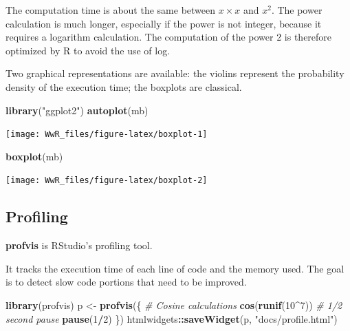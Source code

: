 \documentclass[
  12pt,
  american,
  a4paper,
  extrafontsizes,onecolumn,openright
  ]{memoir}
\newenvironment{Shaded}{\begin{snugshade}}{\end{snugshade}}
\newcommand{\CommentTok}[1]{\textcolor[rgb]{0.56,0.35,0.01}{\textit{#1}}}
\newcommand{\DecValTok}[1]{\textcolor[rgb]{0.00,0.00,0.81}{#1}}
\newcommand{\FunctionTok}[1]{\textcolor[rgb]{0.13,0.29,0.53}{\textbf{#1}}}
\newcommand{\NormalTok}[1]{#1}
\newcommand{\OtherTok}[1]{\textcolor[rgb]{0.56,0.35,0.01}{#1}}
\newcommand{\SpecialCharTok}[1]{\textcolor[rgb]{0.81,0.36,0.00}{\textbf{#1}}}
\newcommand{\StringTok}[1]{\textcolor[rgb]{0.31,0.60,0.02}{#1}}
\begin{document}
\normalsize

The computation time is about the same between \(x \times x\) and \(x^2\).
The power calculation is much longer, especially if the power is not integer, because it requires a logarithm calculation.
The computation of the power 2 is therefore optimized by R to avoid the use of log.

Two graphical representations are available: the violins represent the probability density of the execution time; the boxplots are classical.

\scriptsize

\begin{Shaded}
\begin{Highlighting}[]
\FunctionTok{library}\NormalTok{(}\StringTok{"ggplot2"}\NormalTok{)}
\FunctionTok{autoplot}\NormalTok{(mb)}
\end{Highlighting}
\end{Shaded}

\begin{center}\texttt{[image: WwR\_files/figure-latex/boxplot-1]} \end{center}

\begin{Shaded}
\begin{Highlighting}[]
\FunctionTok{boxplot}\NormalTok{(mb)}
\end{Highlighting}
\end{Shaded}

\begin{center}\texttt{[image: WwR\_files/figure-latex/boxplot-2]} \end{center}

\normalsize

\subsection{Profiling}\label{profiling}

\textbf{profvis} is RStudio's profiling tool.

It tracks the execution time of each line of code and the memory used.
The goal is to detect slow code portions that need to be improved.

\scriptsize

\begin{Shaded}
\begin{Highlighting}[]
\FunctionTok{library}\NormalTok{(profvis)}
\NormalTok{p }\OtherTok{\textless{}{-}} \FunctionTok{profvis}\NormalTok{(\{}
    \CommentTok{\# Cosine calculations}
    \FunctionTok{cos}\NormalTok{(}\FunctionTok{runif}\NormalTok{(}\DecValTok{10}\SpecialCharTok{\^{}}\DecValTok{7}\NormalTok{))}
    \CommentTok{\# 1/2 second pause}
    \FunctionTok{pause}\NormalTok{(}\DecValTok{1}\SpecialCharTok{/}\DecValTok{2}\NormalTok{)}
\NormalTok{\})}
\NormalTok{htmlwidgets}\SpecialCharTok{::}\FunctionTok{saveWidget}\NormalTok{(p, }\StringTok{"docs/profile.html"}\NormalTok{)}
\end{Highlighting}
\end{Shaded}
\end{document}

